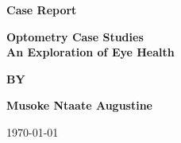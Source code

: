 
\begin{titlepage}
    \begin{center}
        \vspace*{1in}
        \Huge
        \textbf{Case Report}


        \vspace{0.5in}
        \LARGE
        \textbf{Optometry Case Studies}\\
        
        \textbf{An Exploration of Eye Health}
            
        \vspace{0.7in}
        \LARGE
        \textbf{BY}
            
        \vspace{0.7in}
            
        \textbf{Musoke Ntaate Augustine\\}
            
        \vspace{1.2in}
        \LARGE
        
            
        \vspace{0.3in}
            

        
        \Large
        \today
            
        \vspace{1.1in}

    \end{center}
\end{titlepage}
    